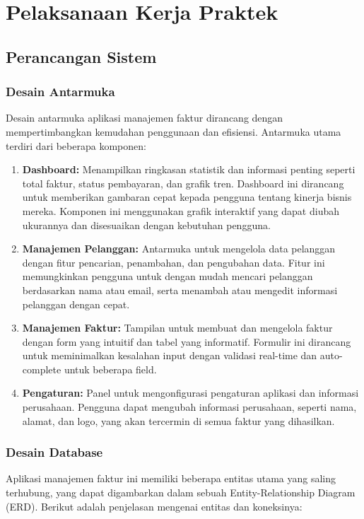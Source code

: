 \documentclass[a4paper]{report}
\begin{document}
\chapter{Pelaksanaan Kerja Praktek}

\section{Perancangan Sistem}
\subsection{Desain Antarmuka}
Desain antarmuka aplikasi manajemen faktur dirancang dengan mempertimbangkan kemudahan 
penggunaan dan efisiensi. Antarmuka utama terdiri dari beberapa komponen:

\begin{enumerate}
\item \textbf{Dashboard:} Menampilkan ringkasan statistik dan informasi penting seperti 
total faktur, status pembayaran, dan grafik tren. Dashboard ini dirancang untuk memberikan 
gambaran cepat kepada pengguna tentang kinerja bisnis mereka. Komponen ini menggunakan 
grafik interaktif yang dapat diubah ukurannya dan disesuaikan dengan kebutuhan pengguna.

\item \textbf{Manajemen Pelanggan:} Antarmuka untuk mengelola data pelanggan dengan fitur 
pencarian, penambahan, dan pengubahan data. Fitur ini memungkinkan pengguna untuk dengan 
mudah mencari pelanggan berdasarkan nama atau email, serta menambah atau mengedit 
informasi pelanggan dengan cepat.

\item \textbf{Manajemen Faktur:} Tampilan untuk membuat dan mengelola faktur dengan form 
yang intuitif dan tabel yang informatif. Formulir ini dirancang untuk meminimalkan 
kesalahan input dengan validasi real-time dan auto-complete untuk beberapa field.

\item \textbf{Pengaturan:} Panel untuk mengonfigurasi pengaturan aplikasi dan informasi 
perusahaan. Pengguna dapat mengubah informasi perusahaan, seperti nama, alamat, dan logo, 
yang akan tercermin di semua faktur yang dihasilkan.
\end{enumerate}

\subsection{Desain Database}
Aplikasi manajemen faktur ini memiliki beberapa entitas utama yang saling terhubung, yang 
dapat digambarkan dalam sebuah Entity-Relationship Diagram (ERD). Berikut adalah 
penjelasan mengenai entitas dan koneksinya:
\end{document}
